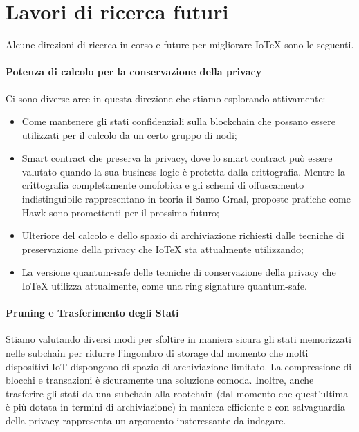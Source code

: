 \section{Lavori di ricerca futuri}
Alcune direzioni di ricerca in corso e future per migliorare IoTeX sono le seguenti.
\paragraph{Potenza di calcolo per la conservazione della privacy}
Ci sono diverse aree in questa direzione che stiamo esplorando attivamente:

\begin{itemize}
    \item Come mantenere gli stati confidenziali sulla blockchain che possano essere utilizzati per il calcolo da un certo gruppo di nodi;

\item Smart contract che preserva la privacy, dove lo smart contract può essere valutato quando la sua business logic è protetta dalla crittografia. Mentre la crittografia completamente omofobica \cite{c26} e gli schemi di offuscamento indistinguibile \cite{c11} rappresentano in teoria il Santo Graal,
proposte pratiche come Hawk \cite{c17} sono promettenti per il prossimo futuro;

\item Ulteriore del calcolo e dello spazio di archiviazione richiesti dalle tecniche di preservazione della privacy che IoTeX sta attualmente utilizzando;

\item La versione quantum-safe delle tecniche di conservazione della privacy che IoTeX utilizza attualmente, come una ring signature quantum-safe.
\end{itemize}



\paragraph{Pruning e Trasferimento degli Stati}
Stiamo valutando diversi modi per sfoltire in maniera sicura gli stati memorizzati nelle subchain per ridurre l'ingombro di storage dal momento che molti dispositivi IoT dispongono di spazio di archiviazione limitato. La compressione di blocchi e transazioni è sicuramente una soluzione comoda. Inoltre, anche trasferire gli stati da una subchain alla rootchain (dal momento che quest'ultima è più dotata in termini di archiviazione) in maniera efficiente e con salvaguardia della privacy rappresenta un argomento insteressante da indagare.

